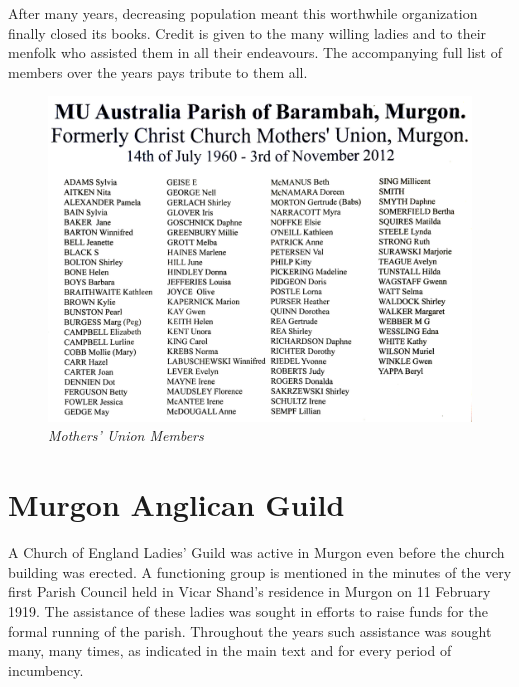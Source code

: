 After many years, decreasing population meant this worthwhile organization finally closed its books. Credit is given to the many willing ladies and to their menfolk who assisted them in all their endeavours. The accompanying full list of members over the years pays tribute to them all.









\begin{figure}[!htb]
\begin{center}
\includegraphics[width=1.\textwidth,center]{../images/MothersUnionNames.jpg}
\caption{\itshape Mothers' Union Members}
\end{center}
\end{figure}




\section{Murgon Anglican Guild}



A Church of England Ladies' Guild was active in Murgon even before the church building was erected. A functioning group is mentioned in the minutes of the very first Parish Council held in Vicar Shand's residence in Murgon on 11 February 1919. The assistance of these ladies was sought in efforts to raise funds for the formal running of the parish. Throughout the years such assistance was sought many, many times, as indicated in the main text and for every period of incumbency.



